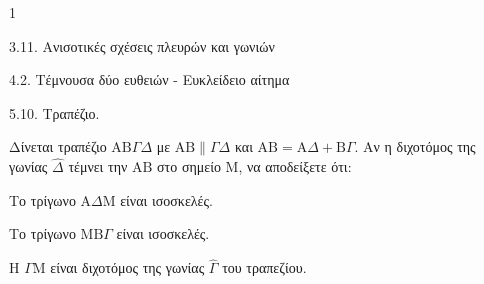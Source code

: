 \begin{ylh}{1}
    \item 3.11. Ανισοτικές σχέσεις πλευρών και γωνιών
    \item 4.2. Τέμνουσα δύο ευθειών - Ευκλείδειο αίτημα
    \item 5.10. Τραπέζιο.
\end{ylh}
Δίνεται τραπέζιο $\mathrm{A}\mathrm{B}\Gamma\Delta$ με $\mathrm{A}\mathrm{B} \parallel \Gamma\Delta$ και $\mathrm{A}\mathrm{B} = \mathrm{A}\Delta + \mathrm{B}\Gamma$. Αν η διχοτόμος της γωνίας $\hat{\Delta}$ τέμνει την $\mathrm{A}\mathrm{B}$ στο σημείο $\mathrm{M}$, να αποδείξετε ότι:
\begin{alist}
    \item Το τρίγωνο $\mathrm{A}\Delta\mathrm{M}$ είναι ισοσκελές. 
    \item Το τρίγωνο $\mathrm{M}\mathrm{B}\Gamma$ είναι ισοσκελές. 
    \item Η $\Gamma\mathrm{M}$ είναι διχοτόμος της γωνίας $\hat{\Gamma}$ του τραπεζίου. 
\end{alist}
